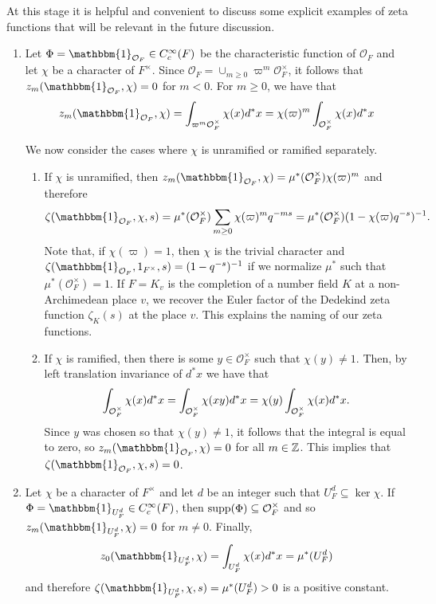 \begin{example}\label{example:zetafnc}
    At this stage it is helpful and convenient to discuss some explicit examples of zeta functions that will be relevant in the future discussion.
    \begin{enumerate}[(1)]
        \item Let $\Phi=\mathbbm{1}_{\mathcal{O}_F}\in C_c^\infty(F)$ be the characteristic function of $\mathcal{O}_F$ and let $\chi$ be a character of $F^\times$. Since $\mathcal{O}_F=\cup_{m\geq0}\varpi^m\mathcal{O}_F^\times$, it follows that $z_m(\mathbbm{1}_{\mathcal{O}_F},\chi)=0$ for $m<0$. For $m\geq 0$, we have that 
        $$z_m(\mathbbm{1}_{\mathcal{O}_F},\chi)=\int_{\varpi^m \mathcal O_F^\times} \chi(x)d^*x=\chi(\varpi)^m\int_{\mathcal{O}_F^\times}\chi(x)d^*x$$
        
        We now consider the cases where $\chi$ is unramified or ramified separately.
        \begin{enumerate}
            \item If $\chi$ is unramified, then $z_m(\mathbbm{1}_{\mathcal{O}_F},\chi)=\mu^*(\mathcal{O}_F^\times)\chi(\varpi)^m$
            and therefore $$\zeta(\mathbbm{1}_{\mathcal{O}_F},\chi,s)=\mu^*(\mathcal{O}_F^\times)\sum_{m\geq0}\chi(\varpi)^mq^{-ms}=\mu^*(\mathcal{O}_F^\times)(1-\chi(\varpi)q^{-s})^{-1}.$$
            Note that, if $\chi(\varpi)=1$, then $\chi$ is the trivial character and $\zeta(\mathbbm{1}_{\mathcal{O}_F},1_{F^\times},s)=(1-q^{-s})^{-1}$ if we normalize $\mu^*$ such that $\mu^*(\mathcal{O}_F^\times)=1$. If $F=K_v$ is the completion of a number field $K$ at a non-Archimedean place $v$, we recover the Euler factor of the Dedekind zeta function $\zeta_K(s)$ at the place $v$. This explains the naming of our zeta functions. 
            \item If $\chi$ is ramified, then there is some $y\in\mathcal{O}_F^\times$ such that $\chi(y)\neq 1$. Then, by left translation invariance of $d^*x$ we have that
            $$\int_{\mathcal O_F^\times} \chi(x)d^*x = \int_{\mathcal O_F^\times} \chi(xy)d^*x = \chi(y)\int_{\mathcal{O}_F^\times} \chi(x) d^*x.$$
            Since $y$ was chosen so that $\chi(y)\neq 1$, it follows that 
            the integral is equal to zero, so $z_m(\mathbbm{1}_{\mathcal{O}_F},\chi)=0$ for all $m\in\mathbb{Z}$. This implies that $\zeta(\mathbbm{1}_{\mathcal{O}_F},\chi,s)=0$.
        \end{enumerate}

        \item Let $\chi$ be a character of $F^\times$ and let $d$ be an integer such that $U_F^d\subseteq\ker\chi$. If $\Phi=\mathbbm{1}_{U_F^d}\in C_c^\infty(F)$, then $\mathrm{supp}(\Phi)\subseteq\mathcal{O}_F^\times$ and so $z_m(\mathbbm{1}_{U_F^d},\chi)=0$ for $m\neq0$. Finally, 
        $$z_0(\mathbbm{1}_{U_F^d},\chi)=\int_{U_F^d}\chi(x)d^*x=\mu^*(U_F^d)$$
        and therefore $\zeta(\mathbbm{1}_{U_F^d},\chi,s)=\mu^*(U_F^d)>0$ is a positive constant.       
    \end{enumerate}
\end{example}


